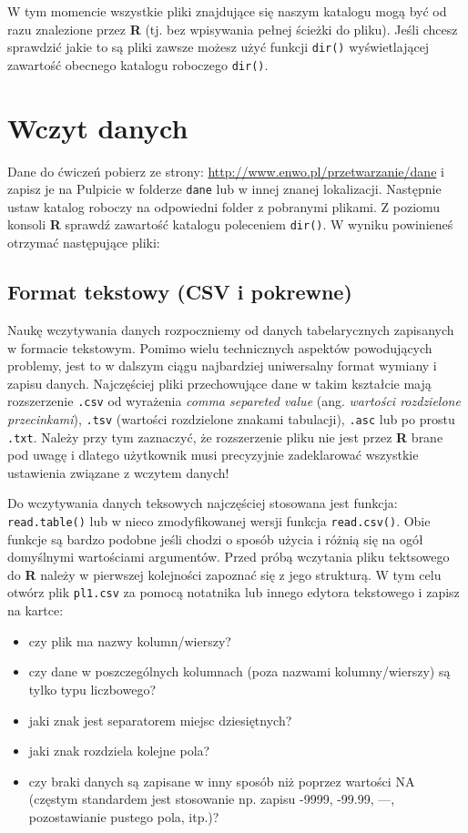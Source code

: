 \documentclass[]{book}
\providecommand{\tightlist}{%
  \setlength{\itemsep}{0pt}\setlength{\parskip}{0pt}}
\theoremstyle{definition}
\theoremstyle{definition}
\theoremstyle{definition}
\theoremstyle{remark}
\begin{document}
W tym momencie wszystkie pliki znajdujące się naszym katalogu mogą być
od razu znalezione przez \textbf{R} (tj. bez wpisywania pełnej ścieżki
do pliku). Jeśli chcesz sprawdzić jakie to są pliki zawsze możesz użyć
funkcji \texttt{dir()} wyświetlającej zawartość obecnego katalogu
roboczego \texttt{dir()}.

\section{Wczyt danych}\label{wczyt-danych}

Dane do ćwiczeń pobierz ze strony:
\url{http://www.enwo.pl/przetwarzanie/dane} i zapisz je na Pulpicie w
folderze \texttt{dane} lub w innej znanej lokalizacji. Następnie ustaw
katalog roboczy na odpowiedni folder z pobranymi plikami. Z poziomu
konsoli \textbf{R} sprawdź zawartość katalogu poleceniem \texttt{dir()}.
W wyniku powinieneś otrzymać następujące pliki:

\subsection{Format tekstowy (CSV i
pokrewne)}\label{format-tekstowy-csv-i-pokrewne}

Naukę wczytywania danych rozpoczniemy od danych tabelarycznych
zapisanych w formacie tekstowym. Pomimo wielu technicznych aspektów
powodujących problemy, jest to w dalszym ciągu najbardziej uniwersalny
format wymiany i zapisu danych. Najczęściej pliki przechowujące dane w
takim kształcie mają rozszerzenie \texttt{.csv} od wyrażenia \emph{comma
separeted value} (ang. \emph{wartości rozdzielone przecinkami}),
\texttt{.tsv} (wartości rozdzielone znakami tabulacji), \texttt{.asc}
lub po prostu \texttt{.txt}. Należy przy tym zaznaczyć, że rozszerzenie
pliku nie jest przez \textbf{R} brane pod uwagę i dlatego użytkownik
musi precyzyjnie zadeklarować wszystkie ustawienia związane z wczytem
danych!

Do wczytywania danych teksowych najczęściej stosowana jest funkcja:
\texttt{read.table()} lub w nieco zmodyfikowanej wersji funkcja
\texttt{read.csv()}. Obie funkcje są bardzo podobne jeśli chodzi o
sposób użycia i różnią się na ogół domyślnymi wartościami argumentów.
Przed próbą wczytania pliku tektsowego do \textbf{R} należy w pierwszej
kolejności zapoznać się z jego strukturą. W tym celu otwórz plik
\texttt{pl1.csv} za pomocą notatnika lub innego edytora tekstowego i
zapisz na kartce:

\begin{itemize}
\tightlist
\item
  czy plik ma nazwy kolumn/wierszy?
\item
  czy dane w poszczególnych kolumnach (poza nazwami kolumny/wierszy) są
  tylko typu liczbowego?
\item
  jaki znak jest separatorem miejsc dziesiętnych?
\item
  jaki znak rozdziela kolejne pola?
\item
  czy braki danych są zapisane w inny sposób niż poprzez wartości NA
  (częstym standardem jest stosowanie np. zapisu -9999, -99.99, ---,
  pozostawianie pustego pola, itp.)?
\end{itemize}
\end{document}
